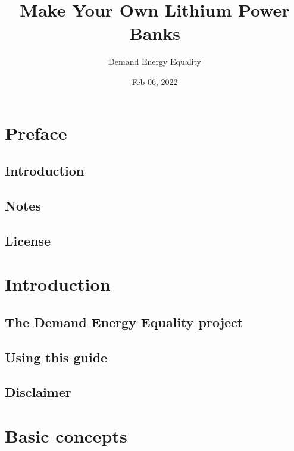 \documentclass[letterpaper,10pt,english]{sphinxmanual}
\title{Make Your Own Lithium Power Banks}
\date{Feb 06, 2022}
\author{Demand Energy Equality}
\begin{document}
\pagestyle{empty}
\sphinxmaketitle
\pagestyle{plain}
\sphinxtableofcontents
\pagestyle{normal}
\label{\detokenize{index::doc}}



\chapter{Preface}
\label{\detokenize{preface:preface}}\label{\detokenize{preface::doc}}

\section{Introduction}
\label{\detokenize{preface:introduction}}

\section{Notes}
\label{\detokenize{preface:notes}}

\section{License}
\label{\detokenize{preface:license}}

\chapter{Introduction}
\label{\detokenize{introduction:introduction}}\label{\detokenize{introduction::doc}}

\section{The Demand Energy Equality project}
\label{\detokenize{introduction:the-demand-energy-equality-project}}

\section{Using this guide}
\label{\detokenize{introduction:using-this-guide}}

\section{Disclaimer}
\label{\detokenize{introduction:disclaimer}}

\chapter{Basic concepts}
\label{\detokenize{basic_concepts:basic-concepts}}\label{\detokenize{basic_concepts::doc}}
\end{document}
